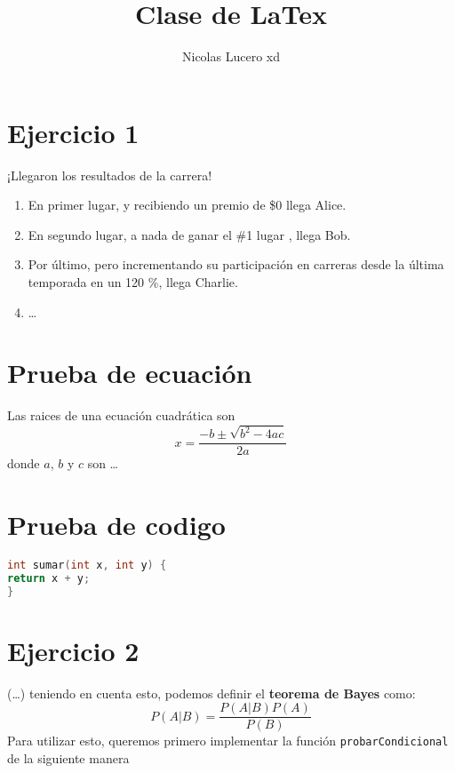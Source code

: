 \documentclass{article}
\title{Clase de LaTex}
\author{Nicolas Lucero xd}
\begin{document}
\maketitle

\section*{Ejercicio 1}
\begin{center}
    ¡Llegaron los resultados de la carrera!
\end{center}

\begin{enumerate}
    \item En primer lugar, y recibiendo un premio de \$0 llega Alice.
    \item En segundo lugar, a nada de ganar el \#1 lugar , llega Bob.
    \item Por último, pero incrementando su participación en carreras desde la última temporada en un 120 \%, llega Charlie.
    \item \dots
\end{enumerate}

\section*{Prueba de ecuación}
Las raices de una ecuación cuadrática son
\begin{equation}
x = \frac{-b \pm \sqrt{b^2 - 4ac}}
{2a}
\end{equation}
donde $a$, $b$ y $c$ son \ldots

\section*{Prueba de codigo}
\begin{lstlisting}[language=c]
int sumar(int x, int y) {
return x + y;
}
\end{lstlisting}

\section*{Ejercicio 2}
(\dots) teniendo en cuenta esto, podemos definir el \textbf{teorema de Bayes}
como:
\begin{equation}
    P(A|B)=\frac{P(A|B)P(A)}{P(B)}
\end{equation}
Para utilizar esto, queremos primero implementar la función
\texttt{probarCondicional} de la siguiente manera
\end{document}
